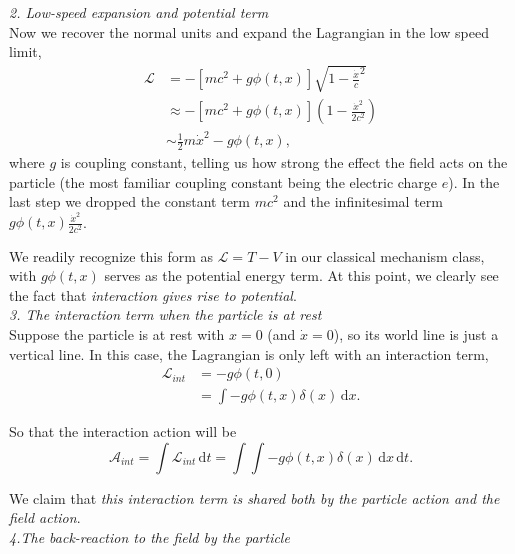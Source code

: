 \documentclass{article}
\newcommand{\be}{\begin{equation}}
\newcommand{\ee}{\end{equation}}
\newcommand{\dif}{\,\mathrm{d}}
\newcommand{\p}{\partial}
\newcommand{\1}{\left}
\newcommand{\2}{\right}
\newcommand{\ma}{\mathcal}
\begin{document}
\textsl{2. Low-speed expansion and potential term}\\

Now we recover the normal units and expand the Lagrangian in the low speed limit,
\be
\begin{split}
\ma L &= -[m c^2+ g\phi(t,x)]\sqrt{1-\frac{\dot x}{c}^2}\\
&\approx -[m c^2+ g\phi(t,x)] \1(1-\frac{\dot x^2}{2c^2}\2)\\
&\sim \frac1 2 m \dot x^2 - g \phi(t,x),
\end{split}
\ee
where $g$ is coupling constant, telling us how strong the effect the field acts on the particle (the most familiar coupling constant being the electric charge $e$). In the last step we dropped the constant term $mc^2$ and the infinitesimal term $g\phi(t,x) \frac{\dot x^2}{2c^2}$.

We readily recognize this form as $\ma L= T-V$ in our classical mechanism class, with $g\phi(t,x)$ serves as the potential energy term. At this point, we clearly see the fact that \emph{\textit{interaction gives rise to potential}}.\\

\textsl{3. The interaction term when the particle is at rest}\\

Suppose the particle is at rest with $x=0$ (and $\dot x=0$), so its world line is just a vertical line.
In this case, the Lagrangian is only left with an interaction term,
\be
\begin{split}
\ma L_{int} &= -g \phi(t,0)\\
&=\int -g\phi(t,x)\delta(x)\dif x.
\end{split}
\ee

So that the interaction action will be
\be
\ma A_{int} =\int \ma L_{int} \dif t= \int\int -g\phi(t,x)\delta(x)\dif x \dif t.
\ee

We claim that \emph{\textit{this interaction term is shared both by the particle action and the field action}}.\\


\textsl{4.The back-reaction to the field by the particle}\\
\end{document}
